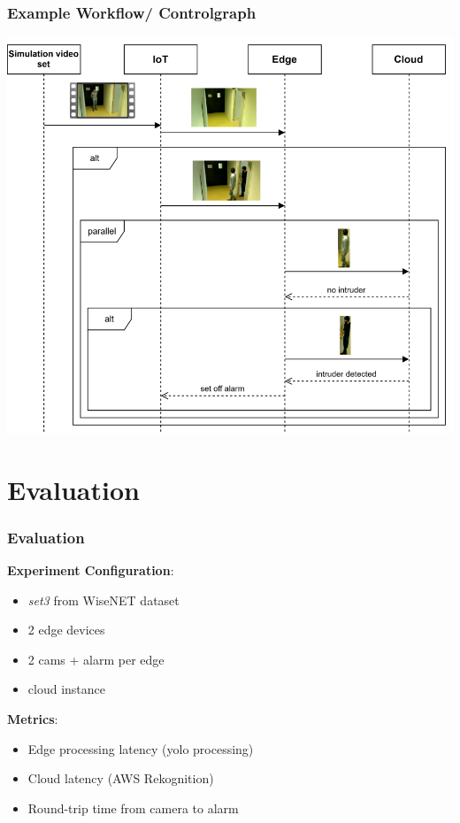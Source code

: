 \documentclass{beamer}
\begin{document}
\begin{frame}
    \begin{center}
        \frametitle{Example Workflow/ Controlgraph}
        \includegraphics[width=0.7\linewidth]{./res/sequenz_diagram.png}
    \end{center}
\end{frame}


\section{Evaluation}
\begin{frame}
\frametitle{Evaluation}
\textbf{Experiment Configuration}:
\begin{itemize}
    \item \textit{set3} from WiseNET dataset
    \item 2 edge devices 
    \item 2 cams + alarm per edge
    \item cloud instance
\end{itemize}
\textbf{Metrics}: 
\begin{itemize}
    \item Edge processing latency (yolo processing)
    \item Cloud latency (AWS Rekognition)
    \item Round-trip time from camera to alarm
\end{itemize}
\end{frame}
\end{document}
